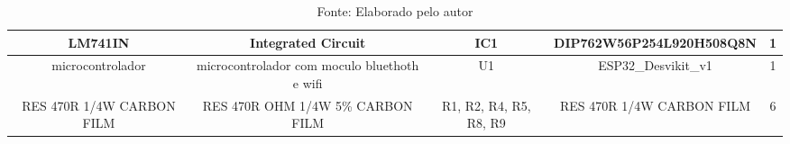 \documentclass[../poliXuniversity_hospital_-USP-report.tex]{subfiles}
\begin{document}
\begin{table}[!h]
\begin{adjustbox}{width=\columnwidth,center}
\begin{tabular}{|c|c|c|c|c|}
LM741IN                   & Integrated Circuit                           & IC1                    & DIP762W56P254L920H508Q8N  & 1        \\ \hline
microcontrolador          & microcontrolador com moculo bluethoth e wifi & U1                     & ESP32\_Desvikit\_v1       & 1        \\ \hline
RES 470R 1/4W CARBON FILM & RES 470R OHM 1/4W 5\% CARBON FILM            & R1, R2, R4, R5, R8, R9 & RES 470R 1/4W CARBON FILM & 6        \\ \hline
\end{tabular}
\end{adjustbox}
\centering
\caption*{Fonte: Elaborado pelo autor}
\label{table:Componentes placa de Controle - Protótipo}
\end{table}
\end{document}
